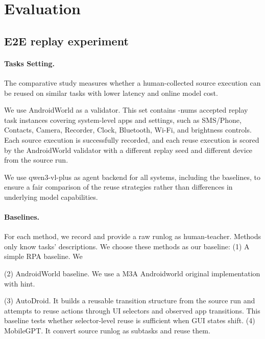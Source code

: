 
\section{Evaluation}
\label{sec:evaluation}

\subsection{E2E replay experiment}
\label{sec:eval-setup}

\paragraph{Tasks Setting.}

The comparative study measures whether a human-collected source
execution can be reused on similar tasks with lower latency and online
model cost.

We use AndroidWorld as a validator. This set contains \task-nums accepted replay task instances covering system-level apps
and settings, such as SMS/Phone, Contacts, Camera, Recorder, Clock, Bluetooth,
Wi-Fi, and brightness controls.  Each source execution is successfully recorded, and each reuse execution is scored by the AndroidWorld validator with a different replay seed and different device from the source run.

We use qwen3-vl-plus as agent backend for all systems, including the baselines, to ensure a fair comparison of the reuse strategies rather than differences in underlying model capabilities.


\paragraph{Baselines.}

For each method, we record and provide a raw runlog as human-teacher. Methods only know tasks' descriptions. We choose these methods as our baseline:
(1) A simple RPA baseline. We

(2) AndroidWorld baseline. We use a M3A Androidworld original implementation with hint.

(3) AutoDroid. It builds a reusable transition structure from the source run and attempts to reuse actions through UI selectors and observed app transitions. This baseline tests whether selector-level reuse is sufficient when GUI states shift.
(4) MobileGPT. It convert source runlog as subtasks and reuse them.

